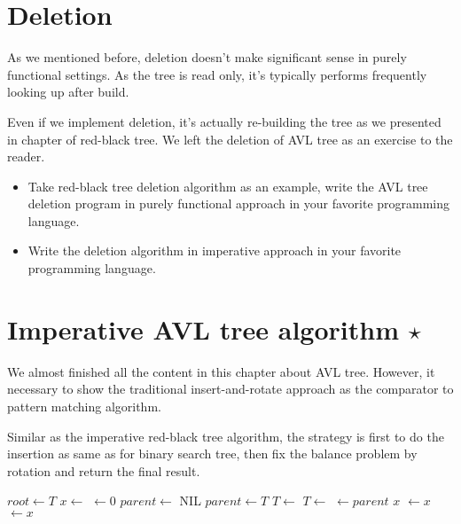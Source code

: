 \documentclass{article}
\begin{document}

\section{Deletion}

As we mentioned before, deletion doesn't make significant sense in
purely functional settings. As the tree is read only, it's typically
performs frequently looking up after build.

Even if we implement deletion, it's actually re-building the tree
as we presented in chapter of red-black tree. We left the deletion
of AVL tree as an exercise to the reader.

\begin{Exercise}

\begin{itemize}

\item Take red-black tree deletion algorithm as an example, write the
AVL tree deletion program in purely functional approach in your
favorite programming language.

\item Write the deletion algorithm in imperative approach in your favorite
programming language.

\end{itemize}

\end{Exercise}

\section{Imperative AVL tree algorithm $\star$}

We almost finished all the content in this chapter about AVL tree.
However, it necessary to show the traditional insert-and-rotate
approach as the comparator to pattern matching algorithm.

Similar as the imperative red-black tree algorithm, the strategy
is first to do the insertion as same as for binary search tree,
then fix the balance problem by rotation and return the final result.

\begin{algorithmic}[1]
  \State $root \gets T$
  \State $x \gets$ 
  \State {} $\gets 0$
  \State $parent \gets$ NIL
    \State $parent \gets T$
      \State $T \gets $ 
    \Else
      \State $T \gets $ 
    \EndIf
  \EndWhile
  \State {} $\gets parent$
   
    \State \Return $x$
    \State {} $\gets x$
  \Else
    \State {} $\gets x$
  \EndIf
  \State \Return {}
\EndFunction
\end{algorithmic}
\end{document}
